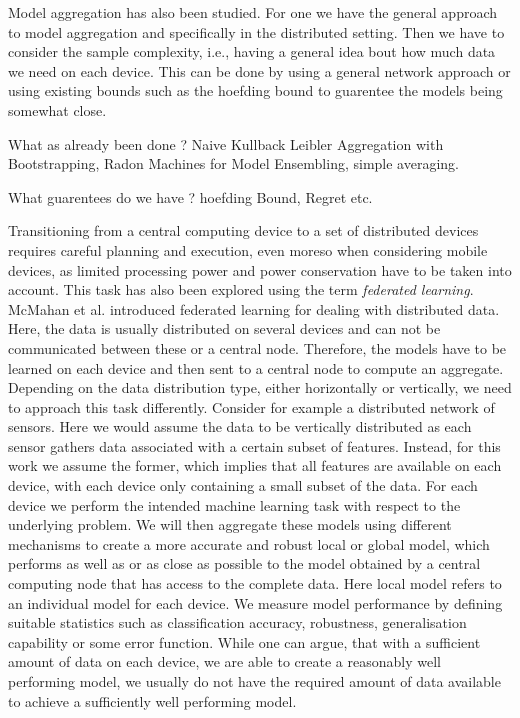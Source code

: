 Model aggregation has also been studied.
For one we have the general approach to model aggregation and specifically in the distributed setting.
Then we have to consider the sample complexity, i.e., having a general idea bout how much data we need on each device.
This can be done by using a general network approach or using existing bounds such as the hoefding bound to guarentee the models being somewhat close.

What as already been done ?
Naive Kullback Leibler Aggregation with Bootstrapping, Radon Machines for Model Ensembling, simple averaging.

What guarentees do we have ? 
hoefding Bound, Regret etc.

Transitioning from a central computing device to a set of distributed devices requires careful planning and execution, even moreso when considering mobile devices, as limited processing power and power conservation have to be taken into account.
This task has also been explored using the term \textit{federated learning}.
McMahan et al. \cite{mcmahan2016communication} introduced federated learning for dealing with distributed data.
Here, the data is usually distributed on several devices and can not be communicated between these or a central node. 
Therefore, the models have to be learned on each device and then sent to a central node to compute an aggregate.
Depending on the data distribution type, either horizontally or vertically, we need to approach this task differently. 
Consider for example a distributed network of sensors.
Here we would assume the data to be vertically distributed as each sensor gathers data associated with a certain subset of features.
Instead, for this work we assume the former, which implies that all features are available on each device, with each device only containing a small subset of the data.
For each device we perform the intended machine learning task with respect to the underlying problem.
We will then aggregate these models using different mechanisms to create a more accurate and robust local or global model, which performs as well as or as close as possible to the model obtained by a central computing node that has access to the complete data.
Here local model refers to an individual model for each device.
We measure model performance by defining suitable statistics such as classification accuracy, robustness, generalisation capability or some error function.
While one can argue, that with a sufficient amount of data on each device, we are able to create a reasonably well performing model, we usually do not have the required amount of data available to achieve a sufficiently well performing model.


